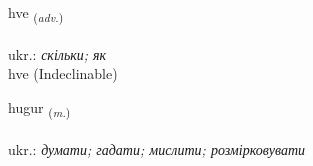 \documentclass[frontgrid, backgrid]{flacards}\usepackage[]{graphicx}\usepackage[]{xcolor}
\begin{document}

\renewcommand{\flhead}{\vskip5pt \fboxsep=0pt {\small\bfseries\footnotesize Atviksorð | прислівник}}
\renewcommand{\fcfoot}{\vskip5pt \fboxsep=0pt \hspace{2pt}{\small\bfseries\footnotesize 1K}}

\renewcommand{\blhead}{\vskip5pt {\small\bfseries\footnotesize Atviksorð | прислівник }}
\renewcommand{\bcfoot}{\vskip5pt \hspace{2pt}{\small\bfseries\footnotesize 1K}}


{hve \small{\textsubscript{(\textit{adv.})}} \\[1ex]
\textphonetic{[kʰvɛː]} \\
ukr.: \emph{скільки; як} \\  [2ex]
hve (Indeclinable)}

\renewcommand{\flhead}{\vskip5pt \fboxsep=0pt {\small\bfseries\footnotesize Nafnorð | іменник}}
\renewcommand{\fcfoot}{\vskip5pt \fboxsep=0pt \hspace{2pt}{\small\bfseries\footnotesize 1K}}

\renewcommand{\blhead}{\vskip5pt {\small\bfseries\footnotesize Nafnorð | іменник }}
\renewcommand{\bcfoot}{\vskip5pt \hspace{2pt}{\small\bfseries\footnotesize 1K}}


{hugur \small{\textsubscript{(\textit{m.})}} \\[1ex] %
\textphonetic{[hʏːɣʏr]} \\
ukr.: \emph{думати; гадати; мислити; розмірковувати} \\  [2ex]
\renewcommand*{\arraystretch}{0.8}
}

\renewcommand{\flhead}{\vskip5pt \fboxsep=0pt {\small\bfseries\footnotesize Nafnorð | іменник}}
\renewcommand{\fcfoot}{\vskip5pt \fboxsep=0pt \hspace{2pt}{\small\bfseries\footnotesize 1K}}
\end{document}
